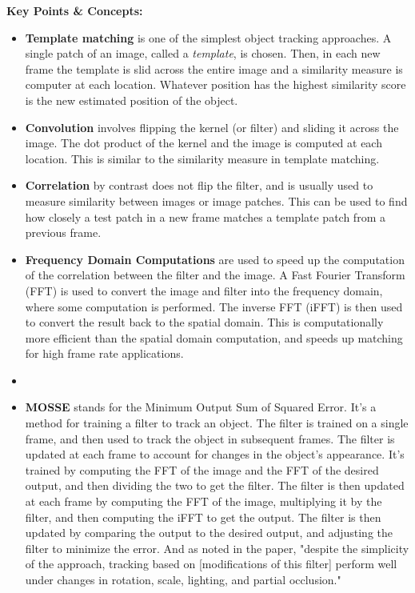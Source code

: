 \documentclass{article}
\begin{document}
\vspace{0.3cm}

\textbf{Key Points \& Concepts:}
\begin{itemize}
  \item \textbf{Template matching} is one of the simplest object tracking approaches. A single patch of an image, called a \emph{template}, is chosen. Then, in each new frame the template is slid across the entire image and a similarity measure is computer at each location. Whatever position has the highest similarity score is the new estimated position of the object. 
  \item \textbf{Convolution} involves flipping the kernel (or filter) and sliding it across the image. The dot product of the kernel and the image is computed at each location. This is similar to the similarity measure in template matching.
  \item \textbf{Correlation} by contrast does not flip the filter, and is usually used to measure similarity between images or image patches. This can be used to find how closely a test patch in a new frame matches a template patch from a previous frame.
  \item \textbf{Frequency Domain Computations} are used to speed up the computation of the correlation between the filter and the image. A Fast Fourier Transform (FFT) is used to convert the image and filter into the frequency domain, where some computation is performed. The inverse FFT (iFFT) is then used to convert the result back to the spatial domain. This is computationally more efficient than the spatial domain computation, and speeds up matching for high frame rate applications.
  \item \item \textbf{MOSSE} stands for the Minimum Output Sum of Squared Error. It's a method for training a filter to track an object. The filter is trained on a single frame, and then used to track the object in subsequent frames. The filter is updated at each frame to account for changes in the object's appearance. It's trained by computing the FFT of the image and the FFT of the desired output, and then dividing the two to get the filter. The filter is then updated at each frame by computing the FFT of the image, multiplying it by the filter, and then computing the iFFT to get the output. The filter is then updated by comparing the output to the desired output, and adjusting the filter to minimize the error. And as noted in the paper, "despite the simplicity of the approach, tracking based on [modifications of this filter] perform well under changes in rotation, scale, lighting, and partial occlusion."
\end{itemize}
\end{document}
